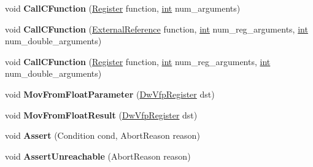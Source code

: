 \begin{DoxyCompactItemize}
\item 
\mbox{\label{classv8_1_1internal_1_1TurboAssembler_a09dacf4e0be8170e3cbd4a489778633e}} 
void {\bfseries Call\+C\+Function} (\mbox{\hyperlink{classv8_1_1internal_1_1Register}{Register}} function, \mbox{\hyperlink{classint}{int}} num\+\_\+arguments)
\item 
\mbox{\label{classv8_1_1internal_1_1TurboAssembler_abdafca48f4971e28009f86e4ff25de15}} 
void {\bfseries Call\+C\+Function} (\mbox{\hyperlink{classv8_1_1internal_1_1ExternalReference}{External\+Reference}} function, \mbox{\hyperlink{classint}{int}} num\+\_\+reg\+\_\+arguments, \mbox{\hyperlink{classint}{int}} num\+\_\+double\+\_\+arguments)
\item 
\mbox{\label{classv8_1_1internal_1_1TurboAssembler_ac47afd32db8e770d2803e3f116c30e60}} 
void {\bfseries Call\+C\+Function} (\mbox{\hyperlink{classv8_1_1internal_1_1Register}{Register}} function, \mbox{\hyperlink{classint}{int}} num\+\_\+reg\+\_\+arguments, \mbox{\hyperlink{classint}{int}} num\+\_\+double\+\_\+arguments)
\item 
\mbox{\label{classv8_1_1internal_1_1TurboAssembler_a4e78624329517de92942c4fadb619ce9}} 
void {\bfseries Mov\+From\+Float\+Parameter} (\mbox{\hyperlink{classv8_1_1internal_1_1DwVfpRegister}{Dw\+Vfp\+Register}} dst)
\item 
\mbox{\label{classv8_1_1internal_1_1TurboAssembler_aff845cbb197bb40e947bfd87505246da}} 
void {\bfseries Mov\+From\+Float\+Result} (\mbox{\hyperlink{classv8_1_1internal_1_1DwVfpRegister}{Dw\+Vfp\+Register}} dst)
\item 
\mbox{\label{classv8_1_1internal_1_1TurboAssembler_a4f3d67b69b1f6e3ed015bf0d98b4464c}} 
void {\bfseries Assert} (Condition cond, Abort\+Reason reason)
\item 
\mbox{\label{classv8_1_1internal_1_1TurboAssembler_a36d9ec6042f44ed7f0c27e283934d359}} 
void {\bfseries Assert\+Unreachable} (Abort\+Reason reason)
\item 

\end{DoxyCompactItemize}
